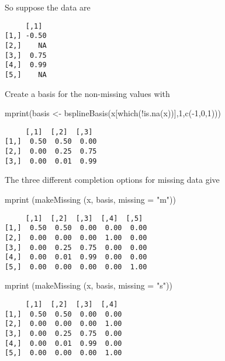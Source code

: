 \documentclass[
  12pt,
  letterpaper,
]{scrbook}
\newenvironment{Shaded}{\begin{snugshade}}{\end{snugshade}}
\newcommand{\AttributeTok}[1]{\textcolor[rgb]{0.40,0.45,0.13}{#1}}
\newcommand{\DecValTok}[1]{\textcolor[rgb]{0.68,0.00,0.00}{#1}}
\newcommand{\FunctionTok}[1]{\textcolor[rgb]{0.28,0.35,0.67}{#1}}
\newcommand{\NormalTok}[1]{\textcolor[rgb]{0.00,0.23,0.31}{#1}}
\newcommand{\OtherTok}[1]{\textcolor[rgb]{0.00,0.23,0.31}{#1}}
\newcommand{\SpecialCharTok}[1]{\textcolor[rgb]{0.37,0.37,0.37}{#1}}
\newcommand{\StringTok}[1]{\textcolor[rgb]{0.13,0.47,0.30}{#1}}
\begin{document}
So suppose the data are

\begin{verbatim}
     [,1] 
[1,] -0.50
[2,]    NA
[3,]  0.75
[4,]  0.99
[5,]    NA
\end{verbatim}

Create a basis for the non-missing values with

\begin{Shaded}
\begin{Highlighting}[]
\FunctionTok{mprint}\NormalTok{(basis }\OtherTok{\textless{}{-}} \FunctionTok{bsplineBasis}\NormalTok{(x[}\FunctionTok{which}\NormalTok{(}\SpecialCharTok{!}\FunctionTok{is.na}\NormalTok{(x))],}\DecValTok{1}\NormalTok{,}\FunctionTok{c}\NormalTok{(}\SpecialCharTok{{-}}\DecValTok{1}\NormalTok{,}\DecValTok{0}\NormalTok{,}\DecValTok{1}\NormalTok{)))}
\end{Highlighting}
\end{Shaded}

\begin{verbatim}
     [,1]  [,2]  [,3] 
[1,]  0.50  0.50  0.00
[2,]  0.00  0.25  0.75
[3,]  0.00  0.01  0.99
\end{verbatim}

The three different completion options for missing data give

\begin{Shaded}
\begin{Highlighting}[]
\FunctionTok{mprint}\NormalTok{ (}\FunctionTok{makeMissing}\NormalTok{ (x, basis, }\AttributeTok{missing =} \StringTok{"m"}\NormalTok{))}
\end{Highlighting}
\end{Shaded}

\begin{verbatim}
     [,1]  [,2]  [,3]  [,4]  [,5] 
[1,]  0.50  0.50  0.00  0.00  0.00
[2,]  0.00  0.00  0.00  1.00  0.00
[3,]  0.00  0.25  0.75  0.00  0.00
[4,]  0.00  0.01  0.99  0.00  0.00
[5,]  0.00  0.00  0.00  0.00  1.00
\end{verbatim}

\begin{Shaded}
\begin{Highlighting}[]
\FunctionTok{mprint}\NormalTok{ (}\FunctionTok{makeMissing}\NormalTok{ (x, basis, }\AttributeTok{missing =} \StringTok{"s"}\NormalTok{))}
\end{Highlighting}
\end{Shaded}

\begin{verbatim}
     [,1]  [,2]  [,3]  [,4] 
[1,]  0.50  0.50  0.00  0.00
[2,]  0.00  0.00  0.00  1.00
[3,]  0.00  0.25  0.75  0.00
[4,]  0.00  0.01  0.99  0.00
[5,]  0.00  0.00  0.00  1.00
\end{verbatim}
\end{document}
